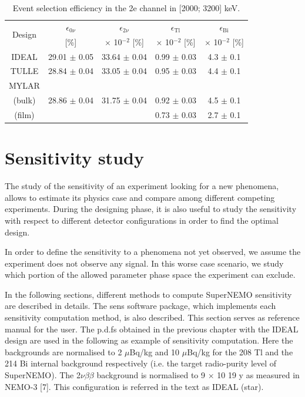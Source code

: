 \documentclass[main.tex]{subfiles}
\begin{document}
\begin{table}[h!]
\centering
\begin{tabular}{c|c|c|c|c}
\multirow{2}{*}{Design} & $\epsilon_{\text{0}\nu}$ & $\epsilon_{\text{2}\nu}$ & $\epsilon_{\text{Tl}}$ & $\epsilon_{\text{Bi}}$  \\
& [\%]   & $\times$ 10$^{-\text{2}}$ [\%] & $\times$ 10$^{-\text{2}}$ [\%] & $\times$ 10$^{-\text{2}}$ [\%] \\[0.1cm]
\toprule
IDEAL & 29.01 $\pm$ 0.05 & 33.64 $\pm$ 0.04 & 0.99 $\pm$ 0.03 & 4.3 $\pm$ 0.1 \\[0.05cm]
\hline
TULLE & 28.84 $\pm$ 0.04 & 33.05 $\pm$ 0.04 & 0.95 $\pm$ 0.03 & 4.4 $\pm$ 0.1 \\[0.05cm]
\hline
MYLAR & & & & \\[0.1cm]
(bulk)& 28.86 $\pm$ 0.04 & 31.75 $\pm$ 0.04 & 0.92 $\pm$ 0.03 & 4.5 $\pm$ 0.1 \\[0.05cm]
(film)& & & 0.73 $\pm$ 0.03 & 2.7 $\pm$ 0.1 \\ 
\bottomrule
\end{tabular}
\caption{Event selection efficiency in the 2e channel in [2000; 3200] keV.}
\label{Tab:EventSelectionEfficiency}
\end{table}


\FloatBarrier


\section{Sensitivity study}\label{sec:SensStudy}


\NI The study of the sensitivity of an experiment looking for a new phenomena, allows to estimate its physics case and compare among different competing experiments. During the designing phase, it is also useful to study the sensitivity with respect to different detector configurations in order to find the optimal design.


\bigskip


\NI In order to define the sensitivity to a phenomena not yet observed, we assume the experiment does not observe any signal. In this worse case scenario, we study which portion of the allowed parameter phase space the experiment can exclude.


\bigskip


\NI In the following sections, different methods to compute SuperNEMO sensitivity are described in details. The sens software package, which implements each sensitivity computation method, is also described. This section serves as reference manual for the user. The p.d.fs obtained in the previous chapter with the IDEAL design are used in the following as example of sensitivity computation. Here the backgrounds are normalised to 2 $\mu$Bq/kg and 10 $\mu$Bq/kg for the 208 Tl and the 214 Bi internal background respectively (i.e. the target radio-purity level of SuperNEMO). The 2$\nu\beta\beta$ background is normalised to 9 $\times$ 10 19 y as measured in NEMO-3 [7]. This configuration is referred in the text as IDEAL (star).
\end{document}
